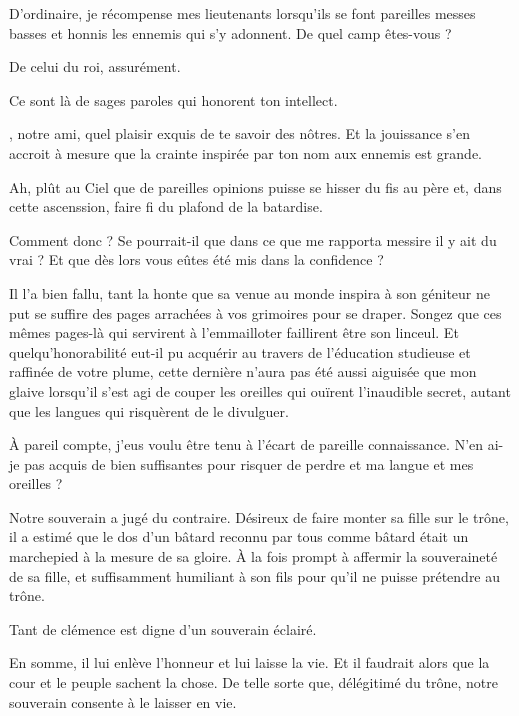 \begin{drama}
  \generalspeaks D’ordinaire, je récompense mes lieutenants lorsqu’ils se font pareilles messes basses et honnis les ennemis qui s’y adonnent. De quel camp êtes-vous ? 

  \alexasspeaks De celui du roi, assurément.

  \generalspeaks Ce sont là de sages paroles qui honorent ton intellect.

  \elenaspeaks \general, notre ami, quel plaisir exquis de te savoir des nôtres. Et la jouissance s’en accroit à mesure que la crainte inspirée par ton nom aux ennemis est grande.

  \generalspeaks Ah, plût au Ciel que de pareilles opinions puisse se hisser du fis au père et, dans cette ascenssion, faire fi du plafond de la batardise.

  \alexasspeaks Comment donc \general ? Se pourrait-il que dans ce que me rapporta messire \elena il y ait du vrai ? Et que dès lors vous eûtes été mis dans la confidence ? 

  \generalspeaks
  Il l’a bien fallu, tant la honte que sa venue au monde inspira à son géniteur ne put se suffire des pages arrachées à vos grimoires pour se draper. Songez que ces mêmes pages-là qui servirent à l’emmailloter faillirent être son linceul.\label{sec:metaphore-papier-linceul}
  Et quelqu’honorabilité eut-il pu acquérir au travers de l’éducation studieuse et raffinée de votre plume, cette dernière n’aura pas été aussi aiguisée que mon glaive lorsqu’il s’est agi de couper les oreilles qui ouïrent l’inaudible secret, autant que les langues qui risquèrent de le divulguer.

  \alexasspeaks À pareil compte, j’eus voulu être tenu à l’écart de pareille connaissance. N’en ai-je pas acquis de bien suffisantes pour risquer de perdre et ma langue et mes oreilles ?

  \generalspeaks Notre souverain a jugé du contraire. Désireux de faire monter sa fille sur le trône, il a estimé que le dos d’un bâtard reconnu par tous comme bâtard était un marchepied à la mesure de sa gloire. À la fois prompt à affermir la souveraineté de sa fille, et suffisamment humiliant à son fils pour qu’il ne puisse prétendre au trône.

  \elenaspeaks Tant de clémence est digne d’un souverain éclairé.

  \alexasspeaks En somme, il lui enlève l’honneur et lui laisse la vie. Et il faudrait alors que la cour et le peuple sachent la chose. De telle sorte que, délégitimé du trône, notre souverain consente à le laisser en vie.


\end{drama}
